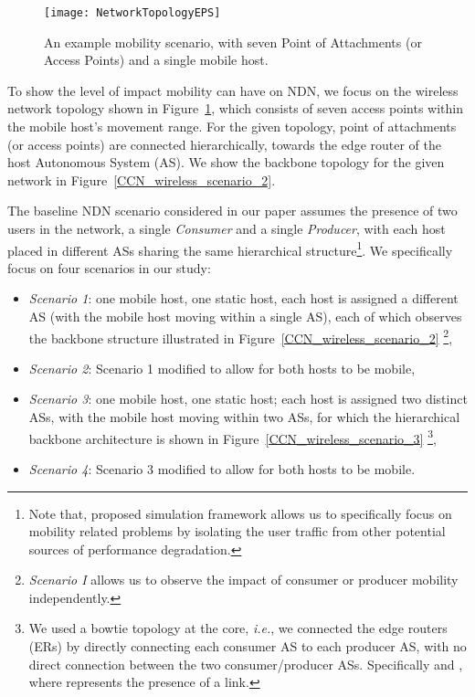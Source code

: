 \documentclass[conference]{IEEEtran}
\begin{document}
\begin{figure}
  \centering
\texttt{[image: NetworkTopologyEPS]}\\
  \caption{An example mobility scenario, with seven Point of Attachments (or Access Points) and a single mobile host.}\label{CCN_wireless_scenario_1}
\end{figure}

To show the level of impact mobility can have on NDN, we focus on the wireless network topology shown in Figure~\ref{CCN_wireless_scenario_1}, which consists of seven access points within the mobile host's movement range. For the given topology, point of attachments (or access points) are connected hierarchically, towards the edge router of the host Autonomous System (AS). We show the backbone topology for the given network in Figure~\ref{CCN_wireless_scenario_2}.

The baseline NDN scenario considered in our paper assumes the presence of two users in the network, a single \emph{Consumer} and a single \emph{Producer}, with each host placed in different ASs sharing the same hierarchical structure\footnote{Note that, proposed simulation framework allows us to specifically focus on mobility related problems by isolating the user traffic from other potential sources of performance degradation.}. We specifically focus on four scenarios in our study:
\begin{itemize}
\item \emph{Scenario 1}: one mobile host, one static host, each host is assigned a different AS (with the mobile host moving within a single AS), each of which observes the backbone structure illustrated in Figure~\ref{CCN_wireless_scenario_2} \footnote{\emph{Scenario I} allows us to observe the impact of consumer or producer mobility independently.},
\item \emph{Scenario 2}: Scenario 1 modified to allow for both hosts to be mobile,
\item \emph{Scenario 3}: one mobile host, one static host; each host is assigned two distinct ASs, with the mobile host moving within two ASs, for which the hierarchical backbone architecture is shown in Figure~\ref{CCN_wireless_scenario_3} \footnote{We used a bowtie topology at the core, \emph{i.e.}, we connected the edge routers (ERs) by directly connecting each consumer AS to each producer AS, with no direct connection between the two consumer/producer ASs. Specifically  and , where  represents the presence of a link.},
\item \emph{Scenario 4}: Scenario 3 modified to allow for both hosts to be mobile.
\end{itemize}
\end{document}
